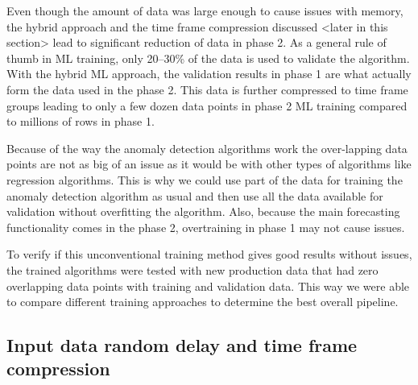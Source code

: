 Even though the amount of data was large enough
to cause issues with memory,
the hybrid approach and the time frame compression discussed <later in this section> %
lead to significant reduction of data in phase 2.
As a general rule of thumb in ML training,
only 20--30\% of the data is used to validate the algorithm.
With the hybrid ML approach,
the validation results in phase 1
are what actually form the data used in the phase 2.
This data is further compressed to time frame groups
leading to only a few dozen data points in phase 2 ML training %
compared to millions of rows in phase 1.

Because of the way the anomaly detection algorithms work
the over-lapping data points are not as big of an issue
as it would be with other types of algorithms
like regression algorithms. %
This is why we could use part of the data
for training the anomaly detection algorithm as usual
and then use all the data available for validation
without overfitting the algorithm. %
Also, because the main forecasting functionality comes in the phase 2,
overtraining %
in phase 1 may not cause issues. %

To verify if this unconventional training method gives good results without issues,
the trained algorithms were tested with new production data
that had zero overlapping data points with training and validation data.
This way we were able to compare different training approaches
to determine the best overall pipeline.











\subsection{Input data random delay and time frame compression}\label{subsec:pipe-random-delay-and-timeframe-compression}

